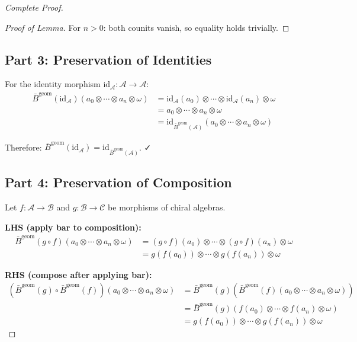 \begin{proof}[Complete Proof]
\begin{proof}[Proof of Lemma]
For $n > 0$: both counits vanish, so equality holds trivially. \qedhere
\end{proof}

\subsection*{Part 3: Preservation of Identities}

For the identity morphism $\text{id}_\mathcal{A}: \mathcal{A} \to \mathcal{A}$:
\begin{align*}
\bar{B}^{\text{geom}}(\text{id}_\mathcal{A})(a_0 \otimes \cdots \otimes a_n \otimes \omega)
&= \text{id}_\mathcal{A}(a_0) \otimes \cdots \otimes \text{id}_\mathcal{A}(a_n) \otimes \omega \\
&= a_0 \otimes \cdots \otimes a_n \otimes \omega \\
&= \text{id}_{\bar{B}^{\text{geom}}(\mathcal{A})}(a_0 \otimes \cdots \otimes a_n \otimes \omega)
\end{align*}

Therefore: $\bar{B}^{\text{geom}}(\text{id}_\mathcal{A}) = \text{id}_{\bar{B}^{\text{geom}}(\mathcal{A})}$. ✓

\subsection*{Part 4: Preservation of Composition}

Let $f: \mathcal{A} \to \mathcal{B}$ and $g: \mathcal{B} \to \mathcal{C}$ be morphisms of chiral algebras.

\textbf{LHS (apply bar to composition):}
\begin{align*}
\bar{B}^{\text{geom}}(g \circ f)(a_0 \otimes \cdots \otimes a_n \otimes \omega)
&= (g \circ f)(a_0) \otimes \cdots \otimes (g \circ f)(a_n) \otimes \omega \\
&= g(f(a_0)) \otimes \cdots \otimes g(f(a_n)) \otimes \omega
\end{align*}

\textbf{RHS (compose after applying bar):}
\begin{align*}
(\bar{B}^{\text{geom}}(g) \circ \bar{B}^{\text{geom}}(f))(a_0 \otimes \cdots \otimes a_n \otimes \omega)
&= \bar{B}^{\text{geom}}(g)(\bar{B}^{\text{geom}}(f)(a_0 \otimes \cdots \otimes a_n \otimes \omega)) \\
&= \bar{B}^{\text{geom}}(g)(f(a_0) \otimes \cdots \otimes f(a_n) \otimes \omega) \\
&= g(f(a_0)) \otimes \cdots \otimes g(f(a_n)) \otimes \omega
\end{align*}


\end{proof}
